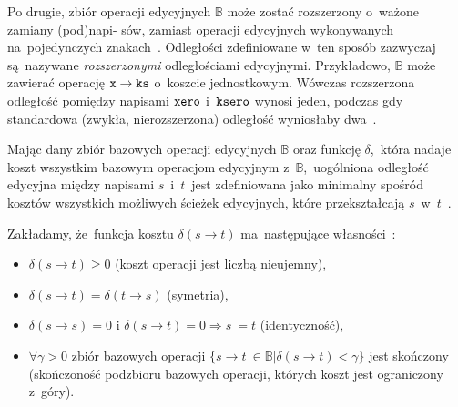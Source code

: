 \documentclass{praca1}
\begin{document}
Po drugie, zbiór operacji edycyjnych $\mathbb{B}$ może zostać rozszerzony o~ważone zamiany (pod)napi- sów, zamiast operacji edycyjnych wykonywanych na~pojedynczych znakach~\cite{Ukkonen1985:algorithmsforapprox}. Odległości zdefiniowane w~ten sposób zazwyczaj są~nazywane \emph{rozszerzonymi} odległościami edycyjnymi. Przykładowo, $\mathbb{B}$ może zawierać operację $\verb|x| \rightarrow \verb|ks|$ o~koszcie jednostkowym. Wówczas rozszerzona odległość pomiędzy napisami $\verb|xero|$ i~$\verb|ksero|$ wynosi jeden, podczas gdy standardowa (zwykła, nierozszerzona) odległość wyniosłaby dwa~\cite{Boytsov2011:indexingmethods}.

\begin{definition}\label{def:002}
Mając dany zbiór bazowych operacji edycyjnych $\mathbb{B}$ oraz funkcję $\delta$,~która nadaje koszt wszystkim bazowym operacjom edycyjnym z~$\mathbb{B}$,~uogólniona odległość edycyjna między napisami $s$~i~$t$~jest zdefiniowana jako minimalny spośród kosztów wszystkich możliwych ścieżek edycyjnych, które przekształcają $s$~w~$t$~\cite{Boytsov2011:indexingmethods}.
\end{definition}


\begin{property}\label{wl:002}
Zakładamy, że~funkcja kosztu $\delta(s \rightarrow t)$ ma~następujące własności~\cite{Boytsov2011:indexingmethods}:
\begin{itemize}
\item $\delta(s \rightarrow t) \geq 0$ (koszt operacji jest liczbą nieujemny),
\item $\delta(s \rightarrow t) = \delta(t \rightarrow s)$ (symetria),
\item $\delta(s \rightarrow s) = 0\text{ i~} \delta(s \rightarrow t) = 0 \Rightarrow s~= t$ (identyczność),
\item $\forall \gamma > 0$ zbiór bazowych operacji $\{s \rightarrow t~\in \mathbb{B} | \delta(s \rightarrow t) < \gamma \}$ jest skończony (skończoność podzbioru bazowych operacji, których koszt jest ograniczony z~góry).
\end{itemize}
\end{property}
\end{document}
